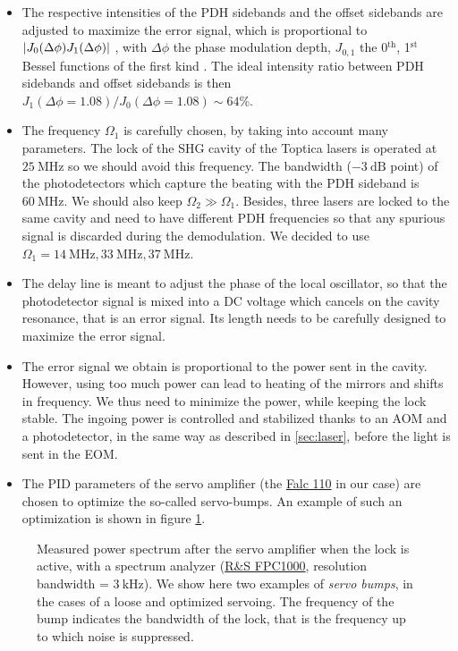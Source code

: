 \documentclass[11pt]{article}
\numberwithin{equation}{section}
\numberwithin{figure}{section}
\begin{document}
\begin{itemize}
	\item The respective intensities of the PDH sidebands and the offset sidebands are adjusted to maximize the error signal, which is proportional to $\abs{J_0(\Delta \phi) J_1(\Delta \phi)}$ \citep{2013_martin}, with $\Delta \phi$ the phase modulation depth, $J_{0,1}$ the 0$^\text{th}$, 1$^\text{st}$ Bessel functions of the first kind . The ideal intensity ratio between PDH sidebands and offset sidebands is then $J_1(\Delta \phi = 1.08) / J_0(\Delta \phi = 1.08) \sim 64$\%.
 	\item The frequency $\Omega_1$ is carefully chosen, by taking into account many parameters. The lock of the SHG cavity of the Toptica lasers is operated at $\SI{25}{\mega\hertz}$ so we should avoid this frequency. The bandwidth ($\SI{-3}{\dB}$ point) of the photodetectors which capture the beating with the PDH sideband is  $\SI{60}{\mega\hertz}$. We should also keep $\Omega_2 \gg \Omega_1$. Besides, three lasers are locked to the same cavity and need to have different PDH frequencies so that any spurious signal is discarded during the demodulation. We decided to use $\Omega_1 = \SI{14}{\mega\hertz},  \SI{33}{\mega\hertz}, \SI{37}{\mega\hertz}$.
 	\item The delay line is meant to adjust the phase of the local oscillator, so that the photodetector signal is mixed into a DC voltage which cancels on the cavity resonance, that is an error signal. Its length needs to be carefully designed to maximize the error signal.
 	\item The error signal we obtain is proportional to the power sent in the cavity. However, using too much power can lead to heating of the mirrors and shifts in frequency. We thus need to minimize the power, while keeping the lock stable. The ingoing power is controlled and stabilized thanks to an AOM and a photodetector, in the same way as described in \ref{sec:laser}, before the light is sent in the EOM.
 	\item The PID parameters of the servo amplifier (the \href{https://www.toptica.com/products/laser-rack-systems/laser-locking-electronics/falc-110-mfalc-110-fast-pid}{Falc 110} in our case) are chosen to optimize the so-called servo-bumps. An example of such an optimization is shown in figure \ref{fig:servo}.
\end{itemize}

%
\begin{figure}[htbp]
	\centering
    
	\caption{\small Measured power spectrum after the servo amplifier when the lock is active, with a spectrum analyzer (\href{https://scdn.rohde-schwarz.com/ur/pws/dl_downloads/dl_common_library/dl_brochures_and_datasheets/pdf_1/FPC_dat-sw_en_5214-7112-22_v0600.pdf}{R\&S FPC1000}, resolution bandwidth = $\SI{3}{\kilo\hertz}$). We show here two examples of \emph{servo bumps}, in the cases of a loose and optimized servoing. The frequency of the bump indicates the bandwidth of the lock, that is the frequency up to which noise is suppressed.}
    \label{fig:servo}
\end{figure}
%
\end{document}
